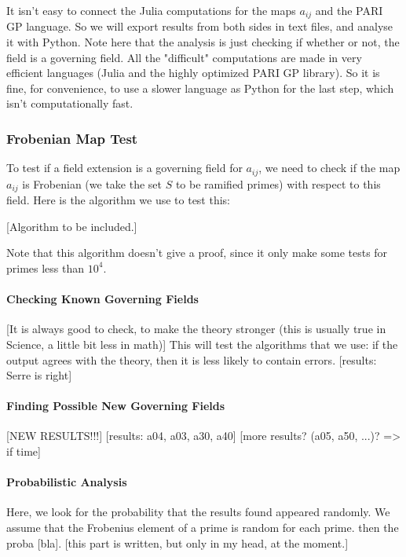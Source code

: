 It isn't easy to connect the Julia computations for the maps $a_{ij}$ and the PARI GP language.
So we will export results from both sides in text files, and analyse it with Python.
Note here that the analysis is just checking if whether or not, the field is a governing field.
All the "difficult" computations are made in very efficient languages (Julia and the highly optimized PARI GP library).
So it is fine, for convenience, to use a slower language as Python for the last step, which isn't computationally fast.


\subsubsection{Frobenian Map Test}
To test if a field extension is a governing field for $a_{ij}$, we need to check if the map $a_{ij}$ is Frobenian (we take the set $S$ to be ramified primes) with respect to this field.
Here is the algorithm we use to test this:

[Algorithm to be included.]


Note that this algorithm doesn't give a proof, since it only make some tests for primes less than $10^4$.

\paragraph{Checking Known Governing Fields}
[It is always good to check, to make the theory stronger (this is usually true in Science, a little bit less in math)]
This will test the algorithms that we use: if the output agrees with the theory, then it is less likely to contain errors.
[results: Serre is right]

\paragraph{Finding Possible New Governing Fields}
[NEW RESULTS!!!]
[results: a04, a03, a30, a40]
[more results? (a05, a50, ...)? => if time]


\paragraph{Probabilistic Analysis}
Here, we look for the probability that the results found appeared randomly.
We assume that the Frobenius element of a prime is random for each prime.
then the proba [bla].
[this part is written, but only in my head, at the moment.]



